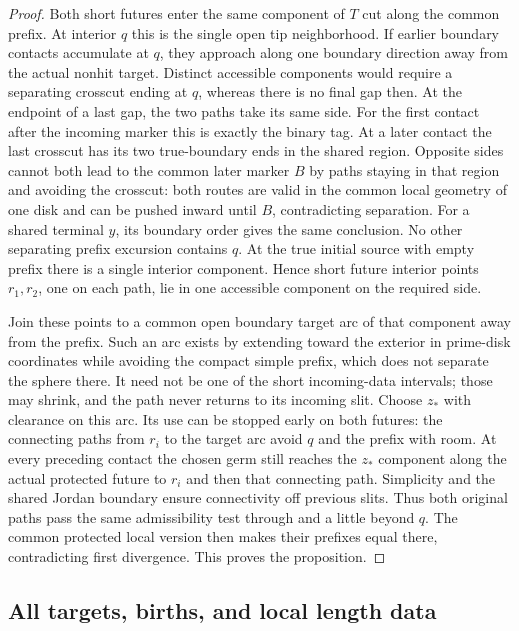 \begin{proof}
Both short futures enter the same component of $T$ cut along the common prefix.  At interior $q$ this is the single open tip neighborhood.  If earlier boundary contacts accumulate at $q$, they approach along one boundary direction away from the actual nonhit target.  Distinct accessible components would require a separating crosscut ending at $q$, whereas there is no final gap then.  At the endpoint of a last gap, the two paths take its same side.  For the first contact after the incoming marker this is exactly the binary tag.  At a later contact the last crosscut has its two true-boundary ends in the shared region.  Opposite sides cannot both lead to the common later marker $B$ by paths staying in that region and avoiding the crosscut: both routes are valid in the common local geometry of one disk and can be pushed inward until $B$, contradicting separation.  For a shared terminal $y$, its boundary order gives the same conclusion.  No other separating prefix excursion contains $q$.  At the true initial source with empty prefix there is a single interior component.  Hence short future interior points $r_1,r_2$, one on each path, lie in one accessible component on the required side.

Join these points to a common open boundary target arc of that component away from the prefix.  Such an arc exists by extending toward the exterior in prime-disk coordinates while avoiding the compact simple prefix, which does not separate the sphere there.  It need not be one of the short incoming-data intervals; those may shrink, and the path never returns to its incoming slit.  Choose $z_*$ with clearance on this arc.  Its use can be stopped early on both futures: the connecting paths from $r_i$ to the target arc avoid $q$ and the prefix with room.  At every preceding contact the chosen germ still reaches the $z_*$ component along the actual protected future to $r_i$ and then that connecting path.  Simplicity and the shared Jordan boundary ensure connectivity off previous slits.  Thus both original paths pass the same admissibility test through and a little beyond $q$.  The common protected local version then makes their prefixes equal there, contradicting first divergence.  This proves the proposition.
\end{proof}

\subsection{All targets, births, and local length data}

